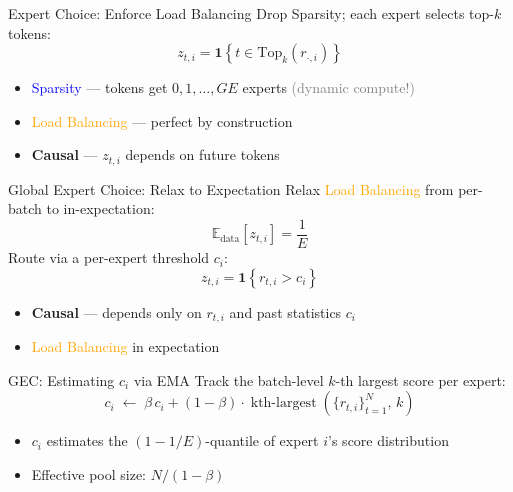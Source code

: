 \documentclass{beamer}
\begin{document}
\begin{frame}{Expert Choice: Enforce Load Balancing}
Drop Sparsity; each expert selects top-$k$ tokens:
\[
z_{t,i} = \mathbf{1}\!\left\{ t \in \mathrm{Top}_k(r_{\cdot,i}) \right\}
\]
\vspace{0.3em}
\begin{itemize}
  \item[\textcolor{red}{$\times$}] \textcolor{blue}{Sparsity} — tokens get $0, 1, \ldots, GE$ experts \textcolor{gray}{(dynamic compute!)}
  \item[\textcolor{blue}{\checkmark}] \textcolor{orange}{Load Balancing} — perfect by construction
  \item[\textcolor{red}{$\times$}] \textbf{Causal} — $z_{t,i}$ depends on future tokens
\end{itemize}
\end{frame}

\begin{frame}{Global Expert Choice: Relax to Expectation}
Relax \textcolor{orange}{Load Balancing} from per-batch to in-expectation:
\[
\mathbb{E}_{\mathrm{data}}\![z_{t,i}] = \frac{1}{E}
\]
\vspace{0.3em}
Route via a per-expert threshold $c_i$:
\[
z_{t,i} = \mathbf{1}\!\left\{ r_{t,i} > c_i \right\}
\]
\vspace{0.3em}
\begin{itemize}
  \item[\textcolor{blue}{\checkmark}] \textbf{Causal} — depends only on $r_{t,i}$ and past statistics $c_i$
  \item[\textcolor{blue}{\checkmark}] \textcolor{orange}{Load Balancing} in expectation
\end{itemize}
\end{frame}

\begin{frame}{GEC: Estimating $c_i$ via EMA}
Track the batch-level $k$-th largest score per expert:
\[
c_i \;\leftarrow\; \beta\, c_i + (1-\beta)\cdot \operatorname{kth\text{-}largest}\!\left(\{r_{t,i}\}_{t=1}^{N},\, k\right)
\]
\vspace{0.3em}
\begin{itemize}
  \item $c_i$ estimates the $(1-1/E)$-quantile of expert $i$'s score distribution
  \item Effective pool size: $N/(1-\beta)$
\end{itemize}
\end{frame}
\end{document}
